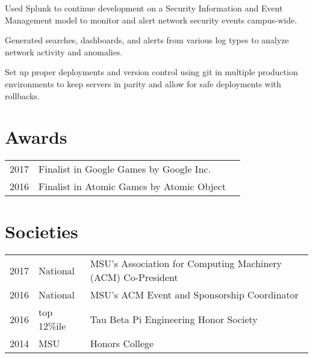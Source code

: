 \documentclass[]{deedy-resume-openfont}
\begin{document}
\begin{minipage}[t]{0.66\textwidth}
\begin{tightemize}
    \end{tightemize}
\sectionsep

\begin{tightemize}
    \item Used Splunk to continue development on a Security Information and Event Management model to monitor and alert network security events campus-wide.
    \item Generated searches, dashboards, and alerts from various log types to analyze network activity and anomalies.
    \item Set up proper deployments and version control using git in multiple production environments to keep servers in parity and allow for safe deployments with rollbacks.
\end{tightemize}
\sectionsep


\section{Awards} 
\begin{tabular}{rll}
2017	     & Finalist in Google Games by Google Inc. \\
2016	     & Finalist in Atomic Games by Atomic Object \\
\end{tabular}
\sectionsep


\section{Societies} 

\begin{tabular}{rll}
2017   & National   & MSU's Association for Computing Machinery (ACM) Co-President \\
2016   &  National  & MSU's ACM Event and Sponsorship Coordinator \\
2016 	& top 12\%ile    & Tau Beta Pi Engineering Honor Society \\
2014   &  MSU   & Honors College \\
\end{tabular}
\sectionsep

\end{minipage} 
\end{document}
